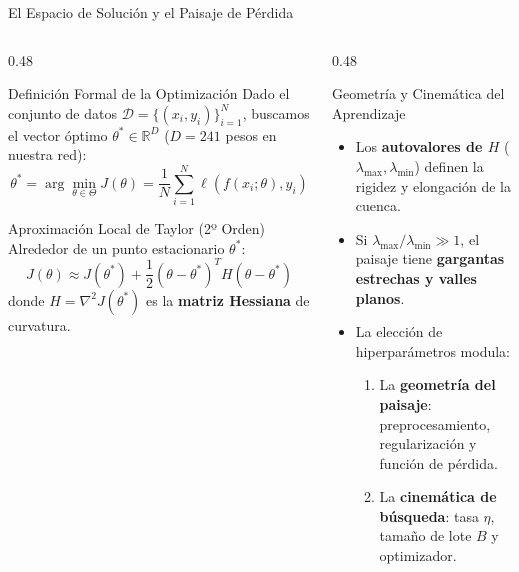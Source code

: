 \documentclass[10pt,aspectratio=169]{beamer}
\begin{document}
\begin{frame}{El Espacio de Solución y el Paisaje de Pérdida}
  \begin{columns}[T]
    \begin{column}{0.48\textwidth}
      \begin{block}{Definición Formal de la Optimización}
        \scriptsize
        Dado el conjunto de datos $\mathcal{D} = \{(x_i, y_i)\}_{i=1}^N$, buscamos el vector óptimo $\theta^* \in \mathbb{R}^D$ ($D=241$ pesos en nuestra red):
        \[
          \theta^* = \arg\min_{\theta \in \Theta} J(\theta) = \frac{1}{N}\sum_{i=1}^N \ell(f(x_i; \theta), y_i)
        \]
      \end{block}

      \vspace{-0.1cm}
      \begin{block}{Aproximación Local de Taylor (2º Orden)}
        \scriptsize
        Alrededor de un punto estacionario $\theta^*$:
        \[
          J(\theta) \approx J(\theta^*) + \frac{1}{2}(\theta - \theta^*)^T H (\theta - \theta^*)
        \]
        donde $H = \nabla^2 J(\theta^*)$ es la \textbf{matriz Hessiana} de curvatura.
      \end{block}
    \end{column}

    \begin{column}{0.48\textwidth}
      \begin{alertblock}{Geometría y Cinemática del Aprendizaje}
        \scriptsize
        \begin{itemize}
          \item Los \textbf{autovalores de $H$} ($\lambda_{\max}, \lambda_{\min}$) definen la rigidez y elongación de la cuenca.
          \item Si $\lambda_{\max} / \lambda_{\min} \gg 1$, el paisaje tiene \textbf{gargantas estrechas y valles planos}.
          \item La elección de hiperparámetros modula:
            \begin{enumerate}\scriptsize
              \item La \textbf{geometría del paisaje}: preprocesamiento, regularización y función de pérdida.
              \item La \textbf{cinemática de búsqueda}: tasa $\eta$, tamaño de lote $B$ y optimizador.
            \end{enumerate}
        \end{itemize}
      \end{alertblock}
    \end{column}
  \end{columns}
\end{frame}
\end{document}
